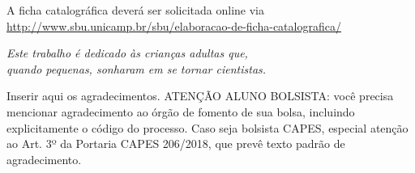 \documentclass[
	oldfontcommands,
	sumario=tradicional,
	12pt,			%
	openright,		%
	oneside,		%
	a4paper,		%
	english,		%
	english			%
	]{imecc-unicamp}
\begin{document}
\begin{fichacatalografica}
    \begin{center}
	{\ABNTEXchapterfont\large A ficha catalográfica deverá ser solicitada online via \url{http://www.sbu.unicamp.br/sbu/elaboracao-de-ficha-catalografica/}}
    \end{center}
%     
\end{fichacatalografica}
\begin{folhadeaprovacao}
%     
\end{folhadeaprovacao}
\begin{dedicatoria}
   \vspace*{\fill}
   \centering
   \noindent
   \textit{
      Este trabalho é dedicado às crianças adultas que,\\
      quando pequenas, sonharam em se tornar cientistas.
   }
   \vspace*{\fill}
\end{dedicatoria}
\begin{agradecimentos}
Inserir aqui os agradecimentos. ATENÇÃO ALUNO BOLSISTA: você precisa mencionar agradecimento ao órgão de fomento de sua bolsa, incluindo explicitamente o código do processo. Caso seja bolsista CAPES, especial atenção ao Art. 3º da Portaria CAPES 206/2018, que prevê texto padrão de agradecimento.
\end{agradecimentos}
\end{document}
